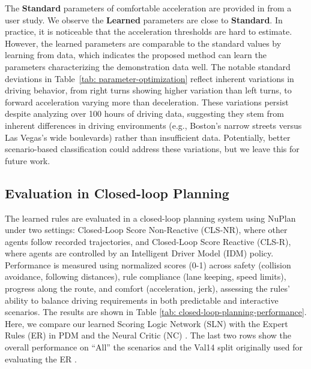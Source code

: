 The \textbf{Standard} parameters of comfortable acceleration are provided in \cite{deWinkel2023Standards} from a user study.
We observe the \textbf{Learned} parameters are close to \textbf{Standard}. In practice, it is noticeable that the acceleration thresholds are hard to estimate. However, the learned parameters are comparable to the standard values by learning from data, which indicates the proposed method can learn the parameters characterizing the demonstration data well. The notable standard deviations in Table~\ref{tab: parameter-optimization} reflect inherent variations in driving behavior, from right turns showing higher variation than left turns, to forward acceleration varying more than deceleration. These variations persist despite analyzing over 100 hours of driving data, suggesting they stem from inherent differences in driving environments (e.g., Boston's narrow streets versus Las Vegas's wide boulevards) rather than insufficient data. Potentially, better scenario-based classification could address these variations, but we leave this for future work.

\subsection{Evaluation in Closed-loop Planning}

The learned rules are evaluated in a closed-loop planning system using NuPlan under two settings: Closed-Loop Score Non-Reactive (CLS-NR), where other agents follow recorded trajectories, and Closed-Loop Score Reactive (CLS-R), where agents are controlled by an Intelligent Driver Model (IDM) policy. Performance is measured using normalized scores (0-1) across safety (collision avoidance, following distances), rule compliance (lane keeping, speed limits), progress along the route, and comfort (acceleration, jerk), assessing the rules' ability to balance driving requirements in both predictable and interactive scenarios. The results are shown in Table \ref{tab: closed-loop-planning-performance}. Here, we compare our learned Scoring Logic Network (SLN) with the Expert Rules (ER) in PDM \cite{Dauner2023CORL} and the Neural Critic (NC) \cite{jiang2022efficient}. The last two rows show the overall performance on ``All'' the scenarios and the Val14 split originally used for evaluating the ER \cite{Dauner2023CORL}.

